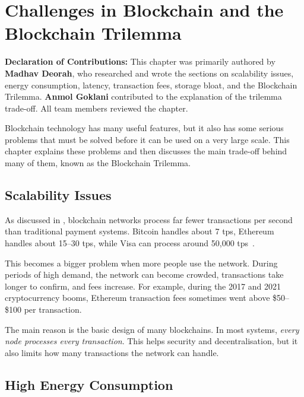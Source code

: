 \chapter{Challenges in Blockchain and the Blockchain Trilemma}
\label{ch:challenges}

\noindent\textbf{Declaration of Contributions:} This chapter was primarily authored by \textbf{Madhav Deorah}, who researched and wrote the sections on scalability issues, energy consumption, latency, transaction fees, storage bloat, and the Blockchain Trilemma. \textbf{Anmol Goklani} contributed to the explanation of the trilemma trade-off. All team members reviewed the chapter.

\bigskip

Blockchain technology has many useful features, but it also has some serious problems that must be solved before it can be used on a very large scale. This chapter explains these problems and then discusses the main trade-off behind many of them, known as the Blockchain Trilemma.

\section{Scalability Issues}
\label{sec:scalability-challenge}

As discussed in , blockchain networks process far fewer transactions per second than traditional payment systems. Bitcoin handles about 7 \gls{tps}, Ethereum handles about 15--30 \gls{tps}, while Visa can process around 50{,}000 \gls{tps}~\cite{kohad2020scalability}.

This becomes a bigger problem when more people use the network. During periods of high demand, the network can become crowded, transactions take longer to confirm, and fees increase. For example, during the 2017 and 2021 cryptocurrency booms, Ethereum transaction fees sometimes went above \$50--\$100 per transaction.

The main reason is the basic design of many blockchains. In most systems, \emph{every node processes every transaction}. This helps security and decentralisation, but it also limits how many transactions the network can handle.

\section{High Energy Consumption}
\label{sec:energy}


